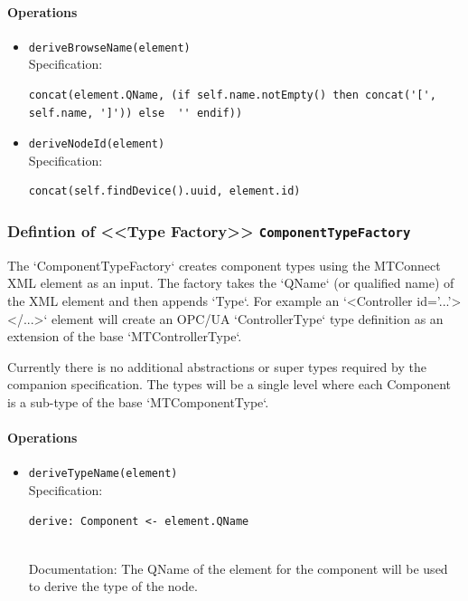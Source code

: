 \paragraph{Operations}
\begin{itemize}
  \item \texttt{deriveBrowseName(element)}\\
    Specification:
   \indent \begin{Verbatim}[xleftmargin=.25in,fontsize=\small]
concat(element.QName, (if self.name.notEmpty() then concat('[', self.name, ']')) else  '' endif))
\end{Verbatim}

  \item \texttt{deriveNodeId(element)}\\
    Specification:
   \indent \begin{Verbatim}[xleftmargin=.25in,fontsize=\small]
concat(self.findDevice().uuid, element.id)
\end{Verbatim}

\end{itemize}
\subsubsection{Defintion of <<Type Factory>> \texttt{ComponentTypeFactory}} \label{type:ComponentTypeFactory}

\FloatBarrier

The `ComponentTypeFactory` creates component types using the MTConnect XML element as an input. 
The factory takes the `QName` (or qualified name) of the XML element and then appends `Type`. For 
example an `<Controller id='...'></...>` element will create an OPC/UA `ControllerType` type definition 
as an extension of the base `MTControllerType`. 

Currently there is no additional abstractions or super types required by the companion specification. 
The types will be a single level where each Component is a sub-type of the base `MTComponentType`.


\paragraph{Operations}
\begin{itemize}
  \item \texttt{deriveTypeName(element)}\\
    Specification:
   \indent \begin{Verbatim}[xleftmargin=.25in,fontsize=\small]
derive: Component <- element.QName
\end{Verbatim}
\\
    Documentation: The QName of the element for the component will be used to derive the type of the node.

\end{itemize}

